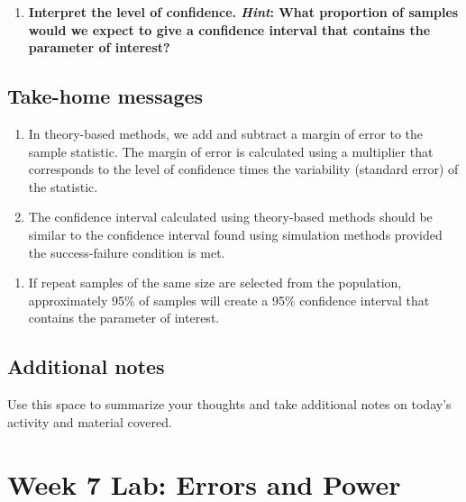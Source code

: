 \documentclass[
]{report}
\providecommand{\tightlist}{%
  \setlength{\itemsep}{0pt}\setlength{\parskip}{0pt}}
\begin{document}
\vspace{0.5in}

\begin{enumerate}
\def\labelenumi{\arabic{enumi}.}
\setcounter{enumi}{10}
\tightlist
\item
  \textbf{Interpret the level of confidence. \emph{Hint}: What proportion of samples would we expect to give a confidence interval that contains the parameter of interest?}
\end{enumerate}

\vspace{0.8in}

\hypertarget{take-home-messages-12}{%
\subsection{Take-home messages}\label{take-home-messages-12}}

\begin{enumerate}
\def\labelenumi{\arabic{enumi}.}
\item
  In theory-based methods, we add and subtract a margin of error to the sample statistic. The margin of error is calculated using a multiplier that corresponds to the level of confidence times the variability (standard error) of the statistic.
\item
  The confidence interval calculated using theory-based methods should be similar to the confidence interval found using simulation methods provided the success-failure condition is met.
\end{enumerate}

\begin{enumerate}
\def\labelenumi{\arabic{enumi}.}
\setcounter{enumi}{2}
\tightlist
\item
  If repeat samples of the same size are selected from the population, approximately 95\% of samples will create a 95\% confidence interval that contains the parameter of interest.
\end{enumerate}

\hypertarget{additional-notes-11}{%
\subsection{Additional notes}\label{additional-notes-11}}

Use this space to summarize your thoughts and take additional notes on today's activity and material covered.

\newpage

\hypertarget{week-7-lab-errors-and-power}{%
\section{Week 7 Lab: Errors and Power}\label{week-7-lab-errors-and-power}}
\end{document}
